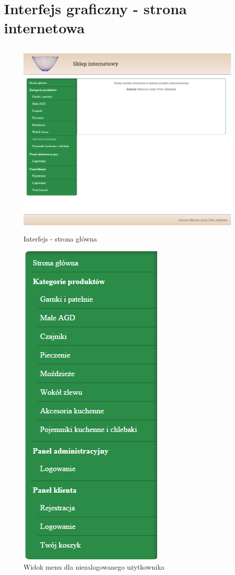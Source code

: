 \chapter{Interfejs graficzny - strona internetowa}
\begin{figure}[H]
	\centering
	\includegraphics[width=17cm, height=10cm] {fig/interfejs}
	\caption{Interfejs - strona główna}
	\label{fig:strona_glowna}
\end{figure}

\begin{figure}[H]
	\centering
	\includegraphics {fig/menu_nie_zalogowany}
	\caption{Widok menu dla niezalogowanego użytkownika}
	\label{fig:nie_zalogowany}
\end{figure}

